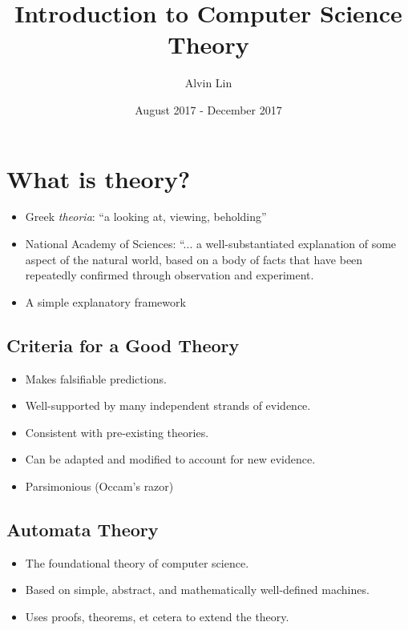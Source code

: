 \documentclass[letterpaper, 12pt]{math}
\title{Introduction to Computer Science Theory}
\author{Alvin Lin}
\date{August 2017 - December 2017}
\begin{document}
\maketitle

\section*{What is theory?}
\begin{itemize}
  \item Greek \textit{theoria}: ``a looking at, viewing, beholding''
  \item National Academy of Sciences: ``... a well-substantiated
    explanation of some aspect of the natural world, based on a body of
    facts that have been repeatedly confirmed through observation and
    experiment.
  \item A simple explanatory framework
\end{itemize}

\subsection*{Criteria for a Good Theory}
\begin{itemize}
  \item Makes falsifiable predictions.
  \item Well-supported by many independent strands of evidence.
  \item Consistent with pre-existing theories.
  \item Can be adapted and modified to account for new evidence.
  \item Parsimonious (Occam's razor)
\end{itemize}

\subsection*{Automata Theory}
\begin{itemize}
  \item The foundational theory of computer science.
  \item Based on simple, abstract, and mathematically well-defined
    machines.
  \item Uses proofs, theorems, et cetera to extend the theory.
\end{itemize}
\end{document}
